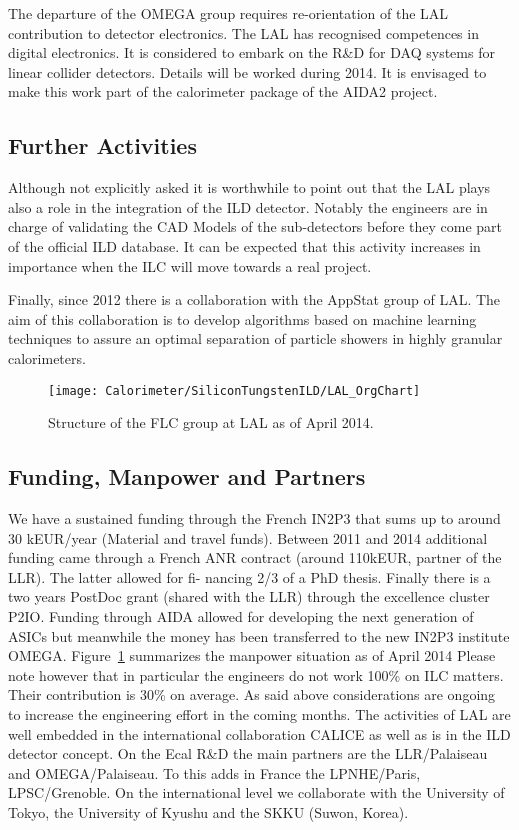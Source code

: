 The departure of the OMEGA group requires re-orientation of the LAL contribution to detector electronics. The LAL has recognised competences in digital electronics. It is considered to embark on the R\&D for DAQ systems for linear collider detectors. Details will be worked during 2014. It is envisaged to make this work part of the calorimeter package of the AIDA2 project.

\subsection{Further Activities}
Although not explicitly asked it is worthwhile to point out that the LAL plays also a role in the integration of the ILD detector. Notably the engineers are in charge of validating the CAD Models of the sub-detectors before they come part of the official ILD database. It can be expected that this activity increases in importance when the ILC will move towards a real project.

Finally, since 2012 there is a collaboration with the AppStat group of LAL. The aim of this collaboration is to develop algorithms based on machine learning techniques to assure an optimal separation of particle showers in highly granular calorimeters.
\begin{figure}
	\centering
	\texttt{[image: Calorimeter/SiliconTungstenILD/LAL\_OrgChart]}
	\caption{Structure of the FLC group at LAL as of April 2014.}
	\label{fig:Calorimeter:LALOrgchart}
\end{figure}
\subsection{Funding, Manpower and Partners}
We have a sustained funding through the French IN2P3 that sums up to around 30 kEUR/year (Material and travel funds). Between 2011 and 2014 additional funding came through a French ANR contract (around 110kEUR, partner of the LLR). The latter allowed for fi- nancing 2/3 of a PhD thesis. Finally there is a two years PostDoc grant (shared with the LLR) through the excellence cluster P2IO. Funding through AIDA allowed for developing the next generation of ASICs but meanwhile the money has been transferred to the new IN2P3 institute OMEGA.
Figure~\ref{fig:Calorimeter:LALOrgchart} summarizes the manpower situation as of April 2014 Please note however that in particular the engineers do not work 100\% on ILC matters. Their contribution is 30\% on average. As said above considerations are ongoing to increase the engineering effort in the coming months.
The activities of LAL are well embedded in the international collaboration CALICE as well as is in the ILD detector concept.
On the Ecal R\&D the main partners are the LLR/Palaiseau and OMEGA/Palaiseau. To this adds in France the LPNHE/Paris, LPSC/Grenoble. On the international level we collaborate with the University of Tokyo, the University of Kyushu and the SKKU (Suwon, Korea).
